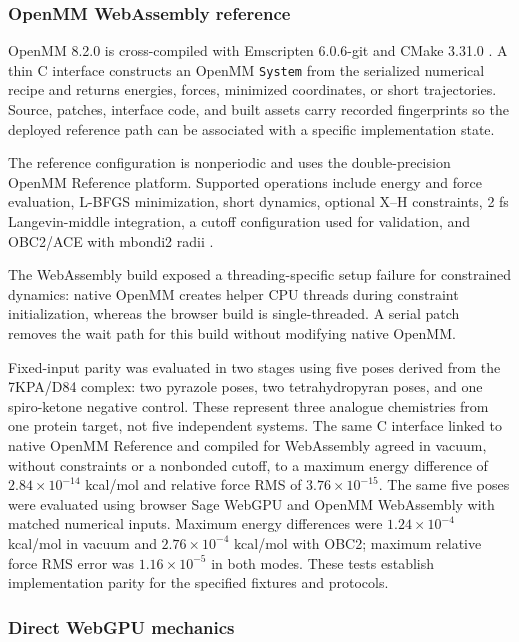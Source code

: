 \documentclass[11pt]{article}
\begin{document}
\begin{small}
\subsubsection{OpenMM WebAssembly reference}

OpenMM 8.2.0 is cross-compiled with Emscripten 6.0.6-git and CMake 3.31.0 \citep{eastman2017openmm7,eastman2024openmm8}. A thin C interface constructs an OpenMM \texttt{System} from the serialized numerical recipe and returns energies, forces, minimized coordinates, or short trajectories. Source, patches, interface code, and built assets carry recorded fingerprints so the deployed reference path can be associated with a specific implementation state.

The reference configuration is nonperiodic and uses the double-precision OpenMM Reference platform. Supported operations include energy and force evaluation, L-BFGS minimization, short dynamics, optional X--H constraints, 2 fs Langevin-middle integration, a cutoff configuration used for validation, and OBC2/ACE with mbondi2 radii \citep{onufriev2004gb}.

The WebAssembly build exposed a threading-specific setup failure for constrained dynamics: native OpenMM creates helper CPU threads during constraint initialization, whereas the browser build is single-threaded. A serial patch removes the wait path for this build without modifying native OpenMM.

Fixed-input parity was evaluated in two stages using five poses derived from the 7KPA/D84 complex: two pyrazole poses, two tetrahydropyran poses, and one spiro-ketone negative control. These represent three analogue chemistries from one protein target, not five independent systems. The same C interface linked to native OpenMM Reference and compiled for WebAssembly agreed in vacuum, without constraints or a nonbonded cutoff, to a maximum energy difference of $2.84 \times 10^{-14}$ kcal/mol and relative force RMS of $3.76 \times 10^{-15}$. The same five poses were evaluated using browser Sage WebGPU and OpenMM WebAssembly with matched numerical inputs. Maximum energy differences were $1.24 \times 10^{-4}$ kcal/mol in vacuum and $2.76 \times 10^{-4}$ kcal/mol with OBC2; maximum relative force RMS error was $1.16 \times 10^{-5}$ in both modes. These tests establish implementation parity for the specified fixtures and protocols.

\subsubsection{Direct WebGPU mechanics}


\end{small}
\end{document}

